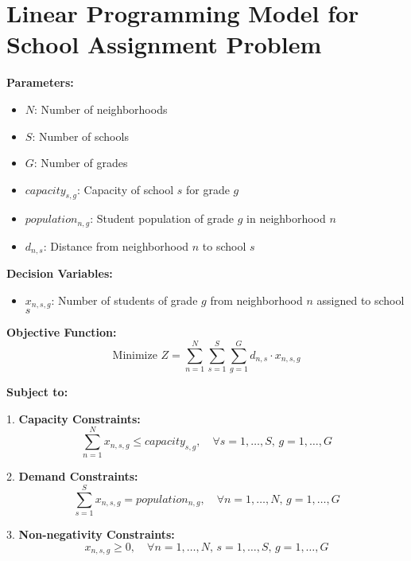 \documentclass{article}
\begin{document}
\section*{Linear Programming Model for School Assignment Problem}

\textbf{Parameters:}
\begin{itemize}
    \item $N$: Number of neighborhoods
    \item $S$: Number of schools
    \item $G$: Number of grades
    \item $capacity_{s,g}$: Capacity of school $s$ for grade $g$
    \item $population_{n,g}$: Student population of grade $g$ in neighborhood $n$
    \item $d_{n,s}$: Distance from neighborhood $n$ to school $s$
\end{itemize}

\textbf{Decision Variables:}
\begin{itemize}
    \item $x_{n,s,g}$: Number of students of grade $g$ from neighborhood $n$ assigned to school $s$
\end{itemize}

\textbf{Objective Function:}
\[
\text{Minimize } Z = \sum_{n=1}^{N} \sum_{s=1}^{S} \sum_{g=1}^{G} d_{n,s} \cdot x_{n,s,g}
\]

\textbf{Subject to:}

1. \textbf{Capacity Constraints:}
\[
\sum_{n=1}^{N} x_{n,s,g} \leq capacity_{s,g}, \quad \forall s=1,\ldots,S, \, g=1,\ldots,G
\]
  
2. \textbf{Demand Constraints:}
\[
\sum_{s=1}^{S} x_{n,s,g} = population_{n,g}, \quad \forall n=1,\ldots,N, \, g=1,\ldots,G
\]

3. \textbf{Non-negativity Constraints:}
\[
x_{n,s,g} \geq 0, \quad \forall n=1,\ldots,N, \, s=1,\ldots,S, \, g=1,\ldots,G
\]
\end{document}
